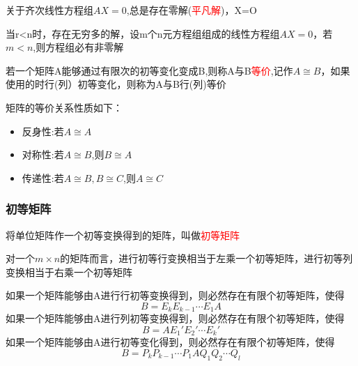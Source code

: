 
关于齐次线性方程组$AX=0$,总是存在零解(\textcolor{red}{平凡解})，X=O


当r<n时，存在无穷多的解，设m个n元方程组组成的线性方程组$AX=0$，若$m<n$,则方程组必有非零解


若一个矩阵A能够通过有限次的初等变化变成B,则称A与B\textcolor{red}{等价},记作$A\cong B$，如果使用的时行(列）初等变化，则称为A与B行(列)等价

矩阵的等价关系性质如下：

\begin{itemize}
    \item {反身性:若$A\cong A$}
    \item {对称性:若$A\cong B$,则$B\cong A$}
    \item {传递性:若$A\cong B,B\cong C$,则$A\cong C$}
\end{itemize}

\subsubsection{初等矩阵}


将单位矩阵作一个初等变换得到的矩阵，叫做\textcolor{red}{初等矩阵}

对一个$m\times n$的矩阵而言，进行初等行变换相当于左乘一个初等矩阵，进行初等列变换相当于右乘一个初等矩阵

\begin{keypoint}
    如果一个矩阵能够由A进行行初等变换得到，则必然存在有限个初等矩阵，使得
$$
B=E_kE_{k-1}\cdots E_1A
$$
如果一个矩阵能够由A进行列初等变换得到，则必然存在有限个初等矩阵，使得
$$
B=AE_1'E_2'\cdots E_k'
$$
如果一个矩阵能够由A进行初等变化得到，则必然存在有限个初等矩阵，使得
$$
B=P_kP_{k-1}\cdots P_1 A Q_1Q_2\cdots Q_l
$$
\end{keypoint}
